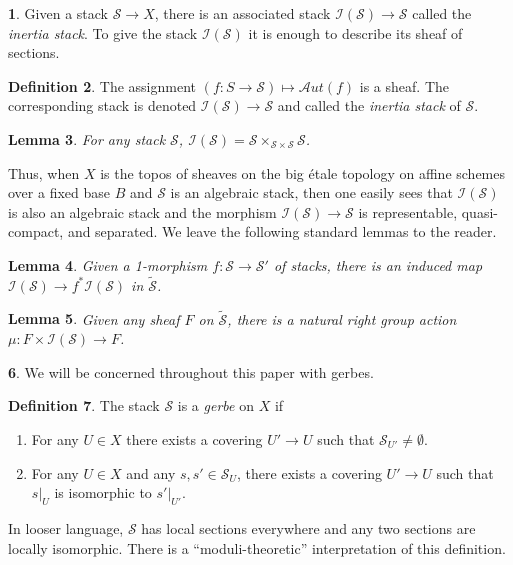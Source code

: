 \documentclass[11pt]{amsart}
\newcommand{\ms}[1]{\mathscr #1}
\newcommand{\saut}{\ms A\!ut}
\renewcommand{\[}{[\!\hspace{0.03em}[}
\renewcommand{\]}{]\!\hspace{0.03em}]}
\renewcommand{\(}{(\!\hspace{0.03em}(}
\renewcommand{\)}{)\!\hspace{0.03em})}
\newtheorem{lem}{Lemma}[subsubsection]%
\theoremstyle{definition}
\newtheorem{defn}[lem]{Definition}
\newtheorem{para}[lem]{\indent}
\theoremstyle{remark}
\begin{document}
\begin{para} Given a stack $\ms S\to X$, there is an associated 
stack $\ms I(\ms S)\to\ms S$ called the \emph{inertia stack\/}.  To give the stack $\ms I(\ms S)$ it is enough to describe its sheaf of sections.
\end{para}

\begin{defn} The assignment $(f:S\to\ms S)\mapsto\saut(f)$ is a sheaf. 
The corresponding stack is denoted $\ms I(\ms S)\to\ms 
S$ and called the \emph{inertia stack\/} of $\ms S$.
\end{defn}

\begin{lem} For any stack $\ms S$, $\ms I(\ms S)=\ms S\times_{\ms S\times\ms S}\ms S$.
\end{lem}

Thus, when $X$ is the topos of sheaves on the big \'etale topology on affine 
schemes over a fixed base $B$ and $\ms S$ is an algebraic stack, then 
one easily sees that $\ms I(\ms S)$ is also an algebraic stack and 
the morphism $\ms I(\ms S)\to\ms S$ is representable, quasi-compact, 
and separated.  We leave the following standard lemmas to the 
reader.

\begin{lem}\label{L:inertia is functorial} Given a 1-morphism $f:\ms 
S\to\ms S'$ of stacks, there is an induced map $\ms I(\ms S)\to 
f^{\ast}\ms I(\ms S)$ in $\widetilde{\ms S}$.
\end{lem}

\begin{lem}\label{L:universal inertia action} Given any sheaf $F$ on $\widetilde{\ms S}$, there is a 
natural right group action $\mu:F\times\ms I(\ms S)\to F$.
\end{lem}

\begin{para}\label{Par:gerbes} We will be concerned throughout this 
paper with gerbes.
\end{para}
\begin{defn}\label{D:gerbe defn} The stack $\ms S$ is a \emph{gerbe\/} on $X$ if 
    \begin{enumerate}
	\item For any $U\in X$ there exists a covering $U'\to U$ such 
	that $\ms S_{U'}\neq\emptyset$.
    
	\item For any $U\in X$ and any $s,s'\in\ms S_{U}$, there 
	exists a covering $U'\to U$ such that $s|_{U}$ is isomorphic 
	to $s'|_{U'}$.
    \end{enumerate}
    
\end{defn}
In looser language, $\ms S$ has local sections everywhere and any two 
sections are locally isomorphic.  There is a ``moduli-theoretic'' 
interpretation of this definition.
\end{document}
